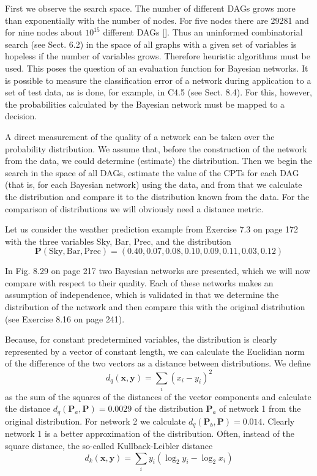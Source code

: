 \documentclass[10pt]{book}
\begin{document}
First we observe the search space. The number of different DAGs grows more than exponentially with the number of nodes. For five nodes there are 29281 and for nine nodes about $10^{15}$ different DAGs [\cite{melancon2000dags}]. Thus an uninformed combinatorial search (see Sect. 6.2) in the space of all graphs with a given set of variables is hopeless if the number of variables grows. Therefore heuristic algorithms must be used. This poses the question of an evaluation function for Bayesian networks. It is possible to measure the classification error of a network during application to a set of test data, as is done, for example, in C4.5 (see Sect. 8.4). For this, however, the probabilities calculated by the Bayesian network must be mapped to a decision.

A direct measurement of the quality of a network can be taken over the probability distribution. We assume that, before the construction of the network from the data, we could determine (estimate) the distribution. Then we begin the search in the space of all DAGs, estimate the value of the CPTs for each DAG (that is, for each Bayesian network) using the data, and from that we calculate the distribution and compare it to the distribution known from the data. For the comparison of distributions we will obviously need a distance metric.

Let us consider the weather prediction example from Exercise 7.3 on page 172 with the three variables Sky, Bar, Prec, and the distribution
$$
\boldsymbol{P}(\text{Sky}, \text{Bar}, \text{Prec})=(0.40,0.07,0.08,0.10,0.09,0.11,0.03,0.12)
$$

In Fig. 8.29 on page 217 two Bayesian networks are presented, which we will now compare with respect to their quality. Each of these networks makes an assumption of independence, which is validated in that we determine the distribution of the network and then compare this with the original distribution (see Exercise 8.16 on page 241).

Because, for constant predetermined variables, the distribution is clearly represented by a vector of constant length, we can calculate the Euclidian norm of the difference of the two vectors as a distance between distributions. We define
$$
d_{q}(\boldsymbol{x}, \boldsymbol{y})=\sum_{i}\left(x_{i}-y_{i}\right)^{2}
$$
as the sum of the squares of the distances of the vector components and calculate the distance $d_{q}\left(\boldsymbol{P}_{a}, \boldsymbol{P}\right)=0.0029$ of the distribution $\boldsymbol{P}_{a}$ of network 1 from the original distribution. For network 2 we calculate $d_{q}\left(\boldsymbol{P}_{b}, \boldsymbol{P}\right)=0.014$. Clearly network 1 is a better approximation of the distribution. Often, instead of the square distance, the so-called Kullback-Leibler distance
$$
d_{k}(\boldsymbol{x}, \boldsymbol{y})=\sum_{i} y_{i}\left(\log _{2} y_{i}-\log _{2} x_{i}\right)
$$
\end{document}
